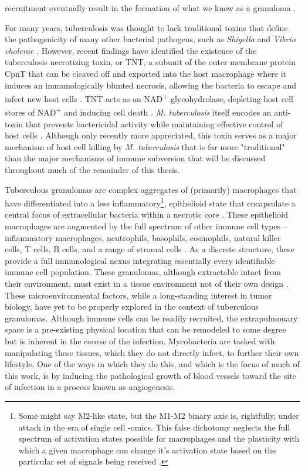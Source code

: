 recruitment eventually result in the formation of what we know as a granuloma \citep{Ramakrishnan2012, Pagan2018}. 

For many years, tuberculosis was thought to lack traditional toxins that define the pathogenicity of many other bacterial pathogens, such as \textit{Shigella} and \textit{Vibrio cholerae} \citep{Gyles2007, Tesh1991, Holmgren1981}. However, recent findings have identified the existence of the tuberculosis necrotizing toxin, or TNT, a subunit of the outer membrane protein CpnT that can be cleaved off and exported into the host macrophage where it induces an immunologically blunted necrosis, allowing the bacteria to escape and infect new host cells \citep{Danilchanka2014, Pajuelo2021, Tak2021, IzguierdoLafuente2021}. TNT acts as an NAD\textsuperscript{+} glycohydrolase, depleting host cell stores of NAD\textsuperscript{+} and inducing cell death \citep{Sun2015, Tak2019, Pajuelo2020}. \textit{M. tuberculosis} itself encodes an anti-toxin that prevents bactericidal activity while maintaining effective control of host cells \citep{Sun2015}. Although only recently more appreciated, this toxin serves as a major mechanism of host cell killing by \textit{M. tuberculosis} that is far more "traditional" than the major mechanisms of immune subversion that will be discussed throughout much of the remainder of this thesis.

Tuberculous granulomas are complex aggregates of (primarily) macrophages that have differentiated into a less inflammatory\footnote{Some might say M2-like state, but the M1-M2 binary axis is, rightfully, under attack in the era of single cell -omics. This false dichotomy neglects the full spectrum of activation states possible for macrophages and the plasticity with which a given macrophage can change it's activation state based on the particular set of signals being received \citep{Martinez2014, Ley2017}.}, epithelioid state that encapsulate a central focus of extracellular bacteria within a necrotic core \citep{Rubin2009, Cronan2016}. These epithelioid macrophages are augmented by the full spectrum of other immune cell types -- inflammatory macrophages, neutrophils, basophils, eosinophils, natural killer cells, T cells, B cells, and a range of stromal cells \citep{Russell2007, Ramakrishnan2012}. As a discrete structure, these provide a full immunological nexus integrating essentially every identifiable immune cell population. These granulomas, although extractable intact from their environment, must exist in a tissue environment not of their own design \citep{Datta2015, Kaplan2003, McCaffrey2022, Cronan2018}. These microenvironmental factors, while a long-standing interest in tumor biology, have yet to be properly explored in the context of tuberculous granulomas. Although immune cells can be readily recruited, the extrapulmonary space is a pre-existing physical location that can be remodeled to some degree but is inherent in the course of the infection. Mycobacteria are tasked with manipulating these tissues, which they do not directly infect, to further their own lifestyle. One of the ways in which they do this, and which is the focus of much of this work, is by inducing the pathological growth of blood vessels toward the site of infection in a process known as angiogenesis.

